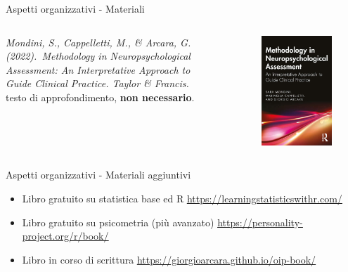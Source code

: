 \documentclass[
  ignorenonframetext,
]{beamer}
\begin{document}
\begin{frame}{Aspetti organizzativi - Materiali}
\label{aspetti-organizzativi---materiali-1}
\begin{columns}
\small
\emph{Mondini, S., Cappelletti, M., \& Arcara, G. (2022). Methodology in Neuropsychological Assessment: An Interpretative Approach to Guide Clinical Practice. Taylor \& Francis.}\\

testo di approfondimento, \textbf{non necessario}.


\begin{figure}
\includegraphics[scale=0.5]{Figures/Methodology_book.png}
\end{figure}

\end{columns}
\end{frame}

\begin{frame}{Aspetti organizzativi - Materiali aggiuntivi}
\label{aspetti-organizzativi---materiali-aggiuntivi}
\begin{itemize}
\item
  Libro gratuito su statistica base ed R
  \href{https://learningstatisticswithr.com/}{\underline{https://learningstatisticswithr.com/}}
\item
  Libro gratuito su psicometria (più avanzato)
  \href{https://personality-project.org/r/book/}{\underline{https://personality-project.org/r/book/}}
\item
  Libro in corso di scrittura
  \href{https://giorgioarcara.github.io/oip-book/}{\underline{https://giorgioarcara.github.io/oip-book/}}
\end{itemize}
\end{frame}
\end{document}
